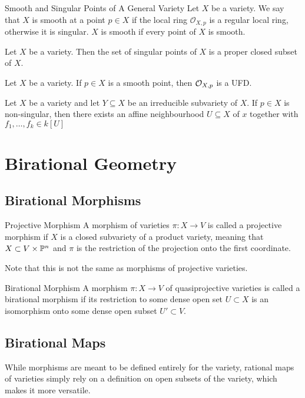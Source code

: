 \documentclass[a4paper]{article}
\begin{document}
\begin{defn}{Smooth and Singular Points of A General Variety}{} Let $X$ be a variety. We say that $X$ is smooth at a point $p\in X$ if the local ring $\mathcal{O}_{X,p}$ is a regular local ring, otherwise it is singular. $X$ is smooth if every point of $X$ is smooth. 
\end{defn}

\begin{thm}{}{} Let $X$ be a variety. Then the set of singular points of $X$ is a proper closed subset of $X$. 
\end{thm}

\begin{prp}{}{} Let $X$ be a variety. If $p\in X$ is a smooth point, then $\mathcal{O}_{X,p}$ is a UFD. 
\end{prp}

\begin{prp}{}{} Let $X$ be a variety and let $Y\subseteq X$ be an irreducible subvariety of $X$. If $p\in X$ is non-singular, then there exists an affine neighbourhood $U\subseteq X$ of $x$ together with $f_1,\dots,f_k\in k[U]$
\end{prp}

\pagebreak
\section{Birational Geometry}
\subsection{Birational Morphisms}
\begin{defn}{Projective Morphism}{} A morphism of varieties $\pi:X\to V$ is called a projective morphism if $X$ is a closed subvariety of a product variety, meaning that $X\subset V\times\mathbb{P}^n$ and $\pi$ is the restriction of the projection onto the first coordinate. 
\end{defn}

Note that this is not the same as morphisms of projective varieties. 

\begin{defn}{Birational Morphism}{} A morphism $\pi:X\to V$ of quasiprojective varieties is called a birational morphism if its restriction to some dense open set $U\subset X$ is an isomorphism onto some dense open subset $U'\subset V$. 
\end{defn}

\subsection{Birational Maps}
While morphisms are meant to be defined entirely for the variety, rational maps of varieties simply rely on a definition on open subsets of the variety, which makes it more versatile. 
\end{document}
